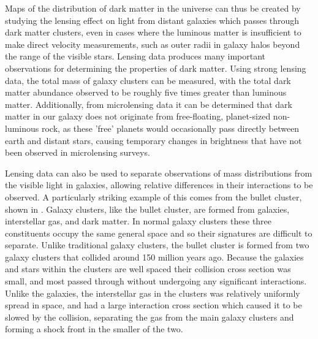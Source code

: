 Maps of the distribution of dark matter in the universe can thus be created by studying the lensing effect on light from distant galaxies which passes through dark matter clusters, even in cases where the luminous matter is insufficient to make direct velocity measurements, such as outer radii in galaxy halos beyond the range of the visible stars.
Lensing data produces many important observations for determining the properties of dark matter.
Using strong lensing data, the total mass of galaxy clusters can be measured, with the total dark matter abundance observed to be roughly five times greater than luminous matter.
Additionally, from microlensing data it can be determined that dark matter in our galaxy does not originate from free-floating, planet-sized non-luminous rock, as these 'free' planets would occasionally pass directly between earth and distant stars, causing temporary changes in brightness that have not been observed in microlensing surveys.

Lensing data can also be used to separate observations of mass distributions from the visible light in galaxies, allowing relative differences in their interactions to be observed. 
A particularly striking example of this comes from the bullet cluster, shown in . 
Galaxy clusters, like the bullet cluster, are formed from galaxies, interstellar gas, and dark matter.
In normal galaxy clusters these three constituents occupy the same general space and so their signatures are difficult to separate.
Unlike traditional galaxy clusters, the bullet cluster is formed from two galaxy clusters that collided around 150 million years ago. 
Because the galaxies and stars within the clusters are well spaced their collision cross section was small, and most passed through without undergoing any significant interactions.
Unlike the galaxies, the interstellar gas in the clusters was relatively uniformly spread in space, and had a large interaction cross section which caused it to be slowed by the collision, separating the gas from the main galaxy clusters and forming a shock front in the smaller of the two.

